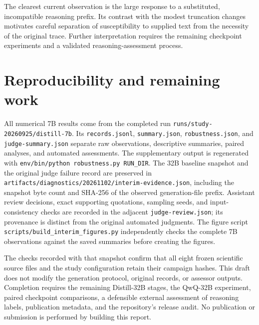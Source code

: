 \documentclass[10pt]{article}
\begin{document}
The clearest current observation is the large response to a substituted,
incompatible reasoning prefix. Its contrast with the modest truncation changes
motivates careful separation of susceptibility to supplied text from the necessity
of the original trace. Further interpretation requires the remaining checkpoint
experiments and a validated reasoning-assessment process.

\section{Reproducibility and remaining work}
All numerical 7B results come from the completed run
\texttt{runs/study-20260925/distill-7b}. Its \texttt{records.jsonl},
\texttt{summary.json}, \texttt{robustness.json}, and
\texttt{judge-summary.json} separate raw observations, descriptive summaries,
paired analyses, and automated assessments. The supplementary output is regenerated
with \texttt{env/bin/python robustness.py RUN\_DIR}. The 32B baseline snapshot
and the original judge failure record are preserved in
\texttt{artifacts/diagnostics/20261102/interim-evidence.json}, including the
snapshot byte count and SHA-256 of the observed generation-file prefix.
Assistant review decisions, exact supporting quotations, sampling seeds, and
input-consistency checks are recorded in the adjacent
\texttt{judge-review.json}; its provenance is distinct from the original
automated judgments. The figure script
\texttt{scripts/build\_interim\_figures.py} independently checks the complete 7B
observations against the saved summaries before creating the figures.

The checks recorded with that snapshot confirm that all eight frozen scientific
source files and the study configuration retain their campaign hashes. This draft
does not modify the generation protocol, original records, or assessor outputs.
Completion requires the remaining Distill-32B stages, the QwQ-32B experiment,
paired checkpoint comparisons, a defensible external assessment of reasoning
labels, publication metadata, and the repository's release audit. No publication
or submission is performed by building this report.
\end{document}
